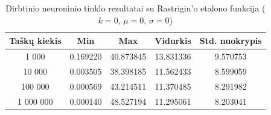 \begin{table}[H]
    \centering
    \begin{tabular}{|c|c|c|c|c|}
        \hline
        \textbf{Taškų kiekis} & \textbf{Min} & \textbf{Max} & \textbf{Vidurkis} & \textbf{Std. nuokrypis} \\ \hline
        1 000        & 0.169220 & 40.873845 & 13.831336 & 9.570753 \\ \hline
        10 000       & 0.003505 & 38.398185 & 11.562433 & 8.599059 \\ \hline
        100 000      & 0.000569 & 43.214511 & 11.370485 & 8.291982 \\ \hline
        1 000 000    & 0.000140 & 48.527194 & 11.295061 & 8.203041 \\ \hline
    \end{tabular}
    \caption{Dirbtinio neuroninio tinklo rezultatai su Rastrigin'o etalono funkcija ($k = 0$, $\mu = 0$, $\sigma = 0$)}
\end{table}